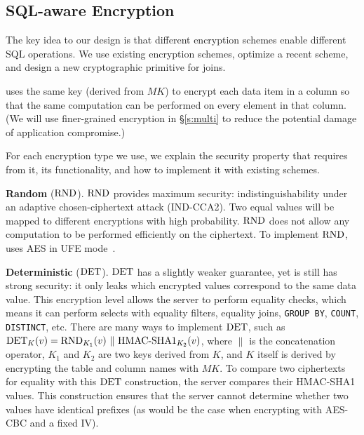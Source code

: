 
\subsection{SQL-aware Encryption}
\label{ss:sqlaware}

The key idea to our design is that different encryption schemes enable
different SQL operations.  We use existing encryption schemes, optimize
a recent scheme, and design a new cryptographic primitive for joins.

\name{} uses the same key (derived from $\mathit{MK}$) to encrypt each  data item in a column so that the same computation can be performed on every
element in that column. (We will
  use finer-grained encryption in \S\ref{s:multi} to reduce the
  potential damage of application compromise.)

For each encryption type we use, we explain the security property that
\name{} requires from it, its functionality, and how to implement it with existing schemes. 
 
\textbf{Random} ($\textrm{RND}$)\@. $\textrm{RND}$ provides maximum security:
indistinguishability under an adaptive chosen-ciphertext attack
(IND-CCA2).  Two equal values will be
mapped to different encryptions with high probability. $\textrm{RND}$ does not
allow any computation to be performed efficiently on the ciphertext.
To implement $\textrm{RND}$, \name{} uses AES in UFE mode~\cite{desai:ufe}.

\textbf{Deterministic} ($\textrm{DET}$)\@. $\textrm{DET}$ has a slightly weaker
guarantee, yet is still has strong security: it only leaks which encrypted values correspond to the same
data value. This encryption level allows the server to perform
equality checks, which means it can perform selects with equality
filters, equality joins, {\tt GROUP BY}, {\tt COUNT}, {\tt DISTINCT},
etc.  There are
many ways to implement $\textrm{DET}$, such as $\textrm{DET}_K(v)=\textrm{RND}_{K_1}(v) ~ \| ~
\textrm{HMAC-SHA1}_{K_2}(v)$, where $\|$ is the
concatenation operator, $K_1$ and $K_2$ are two keys derived from $K$,
and $K$ itself is derived by encrypting the table and column names
with $\mathit{MK}$\@.  To compare two ciphertexts for equality with
this $\textrm{DET}$ construction, the server compares their HMAC-SHA1 values.
This construction ensures that the server cannot determine whether
two values have identical prefixes (as would be the case when
encrypting with AES-CBC and a fixed IV).

